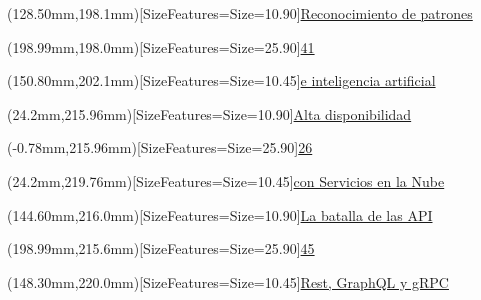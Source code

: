 \documentclass[12pt,spanish,Letterpaper,openany]{book}
\begin{document}
\begin{textblock*}{\textwidth}(128.50mm,198.1mm)[SizeFeatures={Size=10.90}]{\color{titlePart1Contenido}\protect\hyperlink{article12}{Reconocimiento de patrones}}\end{textblock*}

\begin{textblock*}{\textwidth}(198.99mm,198.0mm)[SizeFeatures={Size=25.90}]{\color{white}\protect\hyperlink{article12}{41}}\end{textblock*}

\begin{textblock*}{\textwidth}(150.80mm,202.1mm)[SizeFeatures={Size=10.45}]{\color{titlePart2Contenido}\protect\hyperlink{article12}{e inteligencia artificial}}\end{textblock*}

\begin{textblock*}{\textwidth}(24.2mm,215.96mm)[SizeFeatures={Size=10.90}]{\color{titlePart1Contenido}\protect\hyperlink{article08}{Alta disponibilidad}}\end{textblock*}

\begin{textblock*}{\textwidth}(-0.78mm,215.96mm)[SizeFeatures={Size=25.90}]{\color{white}\protect\hyperlink{article08}{26}}\end{textblock*}

\begin{textblock*}{\textwidth}(24.2mm,219.76mm)[SizeFeatures={Size=10.45}]{\color{titlePart2Contenido}\protect\hyperlink{article08}{con Servicios en la Nube}}\end{textblock*}

\begin{textblock*}{\textwidth}(144.60mm,216.0mm)[SizeFeatures={Size=10.90}]{\color{titlePart1Contenido}\protect\hyperlink{article13}{La batalla de las API}}\end{textblock*}

\begin{textblock*}{\textwidth}(198.99mm,215.6mm)[SizeFeatures={Size=25.90}]{\color{white}\protect\hyperlink{article13}{45}}\end{textblock*}

\begin{textblock*}{\textwidth}(148.30mm,220.0mm)[SizeFeatures={Size=10.45}]{\color{titlePart2Contenido}\protect\hyperlink{article13}{Rest, GraphQL y gRPC}}\end{textblock*}
\end{document}
